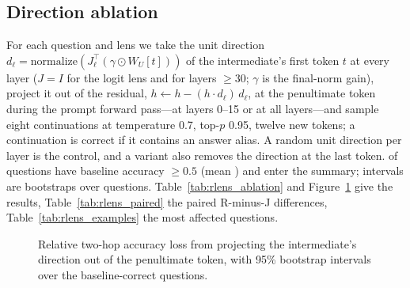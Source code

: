 \documentclass[11pt]{article}
\newcommand{\WU}{W_U}
\begin{document}
\subsection{Direction ablation}
For each question and lens we take the unit direction $d_\ell=\mathrm{normalize}(J_\ell^\top(\gamma\odot\WU[t]))$ of the intermediate's first token $t$ at every layer ($J=I$ for the logit lens and for layers $\ge 30$; $\gamma$ is the final-norm gain), project it out of the residual, $h\leftarrow h-(h\cdot d_\ell)\,d_\ell$, at the penultimate token during the prompt forward pass---at layers 0--15 or at all layers---and sample eight continuations at temperature 0.7, top-$p$ 0.95, twelve new tokens; a continuation is correct if it contains an answer alias. A random unit direction per layer is the control, and a variant also removes the direction at the last token. \ATnGood{} of \ATnQ{} questions have baseline accuracy $\ge0.5$ (mean \ATbase) and enter the summary; intervals are bootstraps over questions. Table~\ref{tab:rlens_ablation} and Figure~\ref{fig:ablation} give the results, Table~\ref{tab:rlens_paired} the paired R-minus-J differences, Table~\ref{tab:rlens_examples} the most affected questions.




\begin{figure}[t]
\centering
{}
\caption{Relative two-hop accuracy loss from projecting the intermediate's direction out of the penultimate token, with 95\% bootstrap intervals over the \ATnGood{} baseline-correct questions.}
\label{fig:ablation}
\end{figure}


\end{document}
